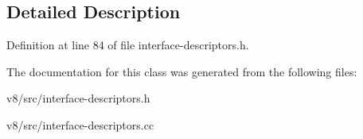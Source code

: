 \subsection{Detailed Description}


Definition at line 84 of file interface-\/descriptors.\+h.



The documentation for this class was generated from the following files\+:\begin{DoxyCompactItemize}
\item 
v8/src/interface-\/descriptors.\+h\item 
v8/src/interface-\/descriptors.\+cc\end{DoxyCompactItemize}
